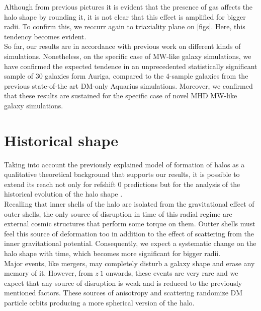 Although from previous pictures it is evident that the presence of gas affects the halo shape by rounding it, it is not clear that this effect is amplified for bigger radii. To confirm this, we reccurr again to triaxiality plane on \ref{figs}. Here, this tendency becomes evident.\\


So far, our results are in accordance with previous work on different kinds of simulations. Nonetheless, on the specific case of MW-like galaxy simulations, we have confirmed the expected tendence in an unprecedented statistically significant sample of 30 galaxies form Auriga, compared to the 4-sample galaxies from the previous state-of-the art DM-only Aquarius simulations. Moreover, we confirmed that these results are sustained for the specific case of novel MHD MW-like galaxy simulations.\\

\section{Historical shape}
Taking into account the previously explained model of formation of halos as a qualitative theoretical background that supports our results, it is possible to extend 
its reach not only for refshift 0 predictions but for the analysis of the historical evolution of the halo shape \cite{}.\\

 Recalling that inner shells of the halo are isolated from the gravitational effect of outer shells, the only source of disruption in time of this radial regime are external cosmic structures that perform some torque on them. Outter shells must feel this source of deformation too in addition to the effect of scattering from the inner gravitational potential. Consequently, we expect a systematic change on the halo shape with time, which becomes more significant for bigger radii.\\
 
Major events, like mergers, may completely disturb a galaxy shape and erase any memory of it. However, from $z~1$ onwards, these events are very rare \cite{} and we expect that any source of disruption is weak and is reduced to the previously mentioned factors. These sources of anisotropy and scattering randomize DM particle orbits producing a more spherical version of the halo. \cite{} \\  

